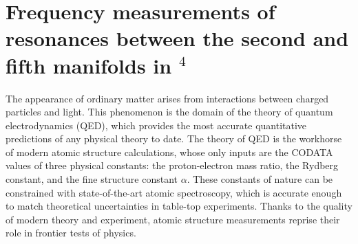 





\chapter{Frequency measurements of resonances between the second and fifth manifolds in {$^4$}\mhe}
\label{chap:transitions}





  {The} appearance of ordinary matter arises from interactions between charged particles and light.
	This phenomenon is the domain of the theory of quantum electrodynamics (QED), which provides the most accurate quantitative predictions of any physical theory to date.
	The theory of QED is the workhorse of modern atomic structure calculations, whose only inputs are the CODATA values of three physical constants: the proton-electron mass ratio, the Rydberg constant, and the fine structure constant $\alpha$.
	These constants of nature can be constrained with state-of-the-art atomic spectroscopy, which is accurate enough to match theoretical uncertainties in table-top experiments.
	Thanks to the quality of modern theory and experiment, atomic structure measurements reprise their role in frontier tests of physics.
	

